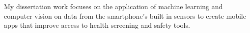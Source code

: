 \justify
My dissertation work focuses on the application of machine learning and computer vision on data from the smartphone's built-in sensors to create mobile apps that improve access to health screening and safety tools. 